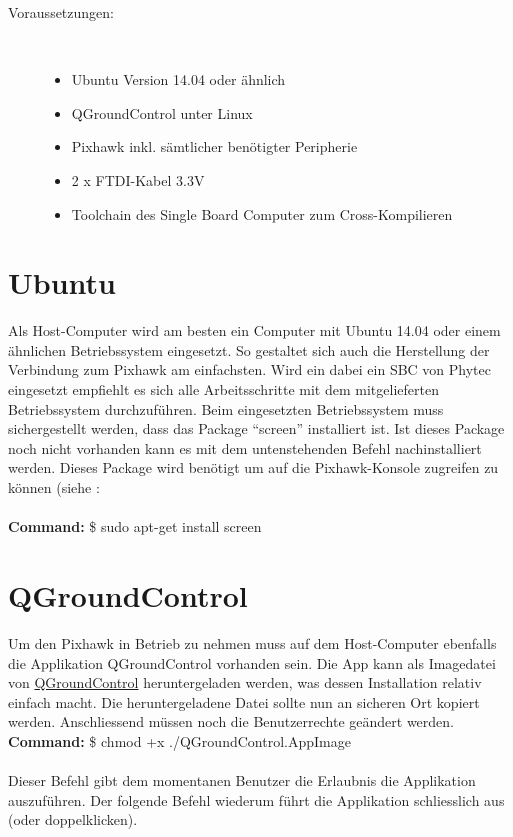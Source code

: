 \documentclass[12pt]{article} %
\begin{document}
	\begin{description}
		\item[Voraussetzungen:]~\par
		\begin{itemize}
			\item Ubuntu Version 14.04 oder ähnlich
			\item QGroundControl unter Linux
			\item Pixhawk inkl. sämtlicher benötigter Peripherie
			\item 2 x FTDI-Kabel 3.3V
			\item Toolchain des Single Board Computer zum Cross-Kompilieren
		\end{itemize}
	\end{description}
	
	
	\section{Ubuntu}
	Als Host-Computer wird am besten ein Computer mit Ubuntu 14.04 oder einem ähnlichen Betriebssystem eingesetzt. So gestaltet sich auch die Herstellung der Verbindung zum Pixhawk am einfachsten. Wird ein dabei ein SBC von Phytec eingesetzt empfiehlt es sich alle Arbeitsschritte mit dem mitgelieferten Betriebssystem durchzuführen. Beim eingesetzten Betriebssystem muss sichergestellt werden, dass das Package "`screen"' installiert ist. Ist dieses Package noch nicht vorhanden kann es mit dem untenstehenden Befehl nachinstalliert werden. Dieses Package wird benötigt um auf die Pixhawk-Konsole zugreifen zu können (siehe :\\
	\\
	\noindent\hspace*{30mm} \textbf{Command:} \$ sudo apt-get install screen
	
	\section{QGroundControl}
	Um den Pixhawk in Betrieb zu nehmen muss auf dem Host-Computer ebenfalls die Applikation QGroundControl vorhanden sein. Die App kann als Imagedatei von \href{https://donlakeflyer.gitbooks.io/qgroundcontrol-user-guide/content/download\_and\_install.html}{QGroundControl} heruntergeladen werden, was dessen Installation relativ einfach macht. Die heruntergeladene Datei sollte nun an sicheren Ort kopiert werden. Anschliessend müssen noch die Benutzerrechte geändert werden.
	\\
	\noindent\hspace*{30mm} \textbf{Command:} \$ chmod +x ./QGroundControl.AppImage\\
	\\
	Dieser Befehl gibt dem momentanen Benutzer die Erlaubnis die Applikation auszuführen. Der folgende Befehl wiederum führt die Applikation schliesslich aus (oder doppelklicken).\\
	
\end{document}

